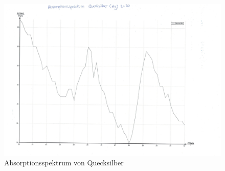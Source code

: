 \begin{figure}[h!]
  \centering
  \includegraphics[width=\textwidth]{quecksilbergraph.pdf}
  \caption{Absorptionsspektrum von Quecksilber}
  \label{fig:quecksilber}
\end{figure}
